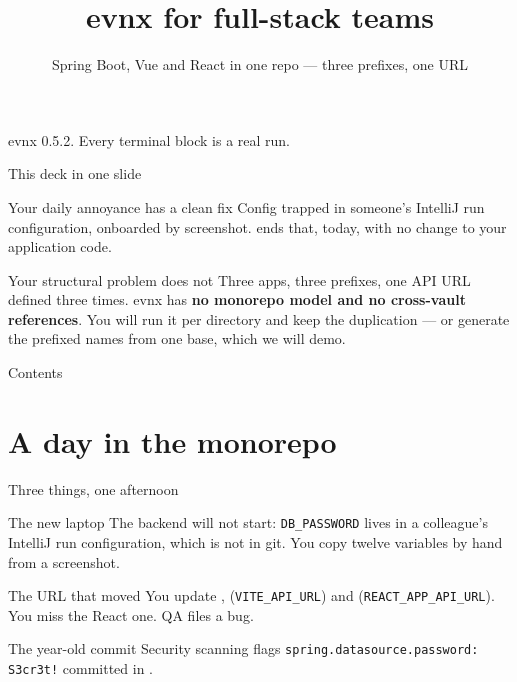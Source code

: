 \documentclass[aspectratio=169,10pt]{beamer}
\title{evnx for full-stack teams}
\subtitle{Spring Boot, Vue and React in one repo --- three prefixes, one URL}
\date{}
\begin{document}
\begin{frame}[plain]
  \titlepage
  \begin{center}\footnotesize
  \textcolor{evnxMuted}{evnx 0.5.2. Every terminal block is a real run.}
  \end{center}
\end{frame}

\begin{frame}{This deck in one slide}
  \begin{block}{Your daily annoyance has a clean fix}
    Config trapped in someone's IntelliJ run configuration, onboarded by
    screenshot.  ends that,
    today, with no change to your application code.
  \end{block}

  \vspace{0.7em}
  \begin{block}{Your structural problem does not}
    Three apps, three prefixes, one API URL defined three times. evnx has
    \textbf{no monorepo model and no cross-vault references}. You will run it
    per directory and keep the duplication --- or generate the prefixed names
    from one base, which we will demo.
  \end{block}
\end{frame}

\begin{frame}{Contents}\tableofcontents[hideallsubsections]\end{frame}

\section{A day in the monorepo}

\begin{frame}{Three things, one afternoon}
  \small
  \begin{block}{The new laptop}
    The backend will not start: \texttt{DB\_PASSWORD} lives in a colleague's
    IntelliJ run configuration, which is not in git. You copy twelve variables
    by hand from a screenshot.
  \end{block}

  \begin{block}{The URL that moved}
    You update ,
     (\texttt{VITE\_API\_URL}) and
     (\texttt{REACT\_APP\_API\_URL}). You
    miss the React one. QA files a bug.
  \end{block}

  \begin{block}{The year-old commit}
    Security scanning flags
    \texttt{spring.datasource.password: S3cr3t!} committed in
    .
  \end{block}
\end{frame}
\end{document}
